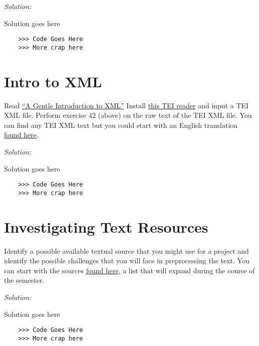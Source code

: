 \documentclass[11pt]{article}
\newenvironment{solution}{
	\vspace{10px}\noindent\emph{Solution:}
}{
	\vspace{10px}
}
\begin{document}
\begin{solution}
	
	Solution goes here
	
	\begin{lstlisting}
	>>> Code Goes Here
	>>> More crap here
	\end{lstlisting}
	
\end{solution} 



\section*{Intro to XML} Read \href{http://www.tei-c.org/release/doc/tei-p5-doc/en/html/SG.html}{“A Gentle Introduction to XML”} 
Install \href{https://github.com/UUDigitalHumanitieslab/tei_reader}{this TEI reader} and input a TEI XML file.
Perform exercise 42 (above) on the raw text of the TEI XML file. You can find any TEI XML text but you could start with an English translation \href{https://github.com/OpenGreekAndLatin/english_trans-dev/tree/master/volumes}{found here}. 


\begin{solution}
	
	Solution goes here
	
	\begin{lstlisting}
	>>> Code Goes Here
	>>> More crap here
	\end{lstlisting}
	
\end{solution} 


\section*{Investigating Text Resources} Identify a possible available textual source that you might use for a project and identify the possible challenges that you will face in preprocessing the text. You can start with the sources \href{https://docs.google.com/document/d/1Hh93ixO_204mtS0Vva-X52bt1ZJMajLHxrcmfWF5JHg/edit}{found here}, a list that will expand during the course of the semester.

\begin{solution}
	
	Solution goes here
	
	\begin{lstlisting}
	>>> Code Goes Here
	>>> More crap here
	\end{lstlisting}
	
\end{solution} 
\end{document}
